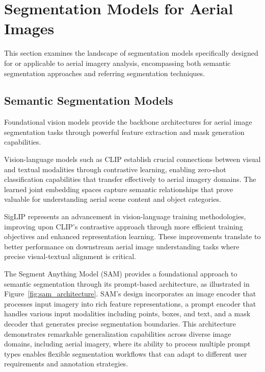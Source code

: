 \section{Segmentation Models for Aerial Images}

This section examines the landscape of segmentation models specifically designed for or applicable to aerial imagery analysis, encompassing both semantic segmentation approaches and referring segmentation techniques.

\subsection{Semantic Segmentation Models}

Foundational vision models provide the backbone architectures for aerial image segmentation tasks through powerful feature extraction and mask generation capabilities.

Vision-language models such as CLIP establish crucial connections between visual and textual modalities through contrastive learning, enabling zero-shot classification capabilities that transfer effectively to aerial imagery domains. The learned joint embedding spaces capture semantic relationships that prove valuable for understanding aerial scene content and object categories.

SigLIP represents an advancement in vision-language training methodologies, improving upon CLIP's contrastive approach through more efficient training objectives and enhanced representation learning. These improvements translate to better performance on downstream aerial image understanding tasks where precise visual-textual alignment is critical.

The Segment Anything Model (SAM) provides a foundational approach to semantic segmentation through its prompt-based architecture, as illustrated in Figure~\ref{fig:sam_architecture}. SAM's design incorporates an image encoder that processes input imagery into rich feature representations, a prompt encoder that handles various input modalities including points, boxes, and text, and a mask decoder that generates precise segmentation boundaries. This architecture demonstrates remarkable generalization capabilities across diverse image domains, including aerial imagery, where its ability to process multiple prompt types enables flexible segmentation workflows that can adapt to different user requirements and annotation strategies.

